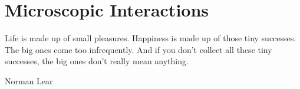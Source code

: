 \chapter{Microscopic Interactions}
\epigraph{  \begin{SingleSpace} Life is made up of small pleasures. Happiness is made up of those tiny successes. The big ones come too infrequently. And if you don't collect all these tiny successes, the big ones don't really mean anything. \end{SingleSpace} }{Norman Lear}